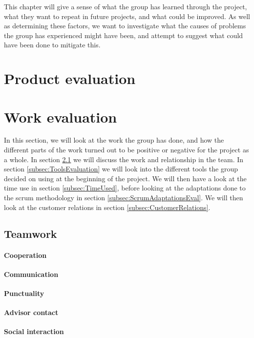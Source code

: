\documentclass[11pt,a4paper,titlepage,oneside]{report}
\begin{document}
This chapter will give a sense of what the group has learned through the project, what they want to repeat in future projects, and what could be improved. As well as determining these factors, we want to investigate what the causes of problems the group has experienced might have been, and attempt to suggest what could have been done to mitigate this. 

\section{Product evaluation}


\section{Work evaluation}
In this section, we will look at the work the group has done, and how the different parts of the work turned out to be positive or negative for the project as a whole. In section \ref{subsec:Teamwork} we will discuss the work and relationship in the team. In section \ref{subsec:ToolsEvaluation} we will look into the different tools the group decided on using at the beginning of the project. We will then have a look at the time use in section \ref{subsec:TimeUsed}, before looking at the adaptations done to the scrum methodology in section \ref{subsec:ScrumAdaptationsEval}. We will then look at the customer relations in section \ref{subsec:CustomerRelations}.
\subsection{Teamwork}
\label{subsec:Teamwork}
\paragraph{Cooperation}
\paragraph{Communication}
\paragraph{Punctuality}
\paragraph{Advisor contact}
\paragraph{Social interaction}
\end{document}
